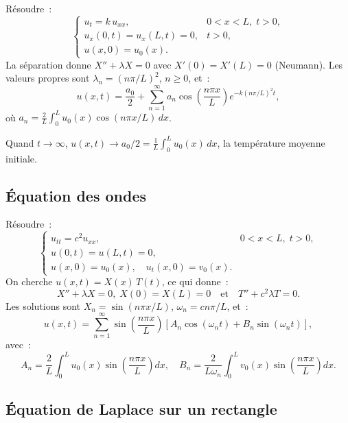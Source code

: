 \begin{exemple}
R\'esoudre~:
\[
    \begin{cases}
        u_t = k\, u_{xx}, & 0 < x < L,\; t > 0,\\
        u_x(0,t) = u_x(L,t) = 0, & t > 0,\\
        u(x,0) = u_0(x).
    \end{cases}
\]
La s\'eparation donne $X'' + \lambda X = 0$ avec $X'(0) = X'(L) = 0$
(Neumann). Les valeurs propres sont $\lambda_n = (n\pi/L)^2$,
$n \geq 0$, et~:
\[
    u(x,t) = \frac{a_0}{2} + \sum_{n=1}^{\infty} a_n
    \cos\!\left(\frac{n\pi x}{L}\right) e^{-k(n\pi/L)^2 t},
\]
o\`u $a_n = \frac{2}{L}\int_0^L u_0(x)\cos(n\pi x/L)\, dx$.

Quand $t \to \infty$, $u(x,t) \to a_0/2 = \frac{1}{L}\int_0^L u_0(x)\, dx$,
la temp\'erature moyenne initiale.
\end{exemple}

\subsection{\'Equation des ondes}

\begin{exemple}
R\'esoudre~:
\[
    \begin{cases}
        u_{tt} = c^2 u_{xx}, & 0 < x < L,\; t > 0,\\
        u(0,t) = u(L,t) = 0,\\
        u(x,0) = u_0(x), \quad u_t(x,0) = v_0(x).
    \end{cases}
\]
On cherche $u(x,t) = X(x)\, T(t)$, ce qui donne~:
\[
    X'' + \lambda X = 0, \; X(0)=X(L)=0 \quad\text{et}\quad
    T'' + c^2\lambda T = 0.
\]
Les solutions sont $X_n = \sin(n\pi x/L)$,
$\omega_n = cn\pi/L$, et~:
\[
    u(x,t) = \sum_{n=1}^{\infty} \sin\!\left(\frac{n\pi x}{L}\right)
    \left[A_n \cos(\omega_n t) + B_n \sin(\omega_n t)\right],
\]
avec~:
\[
    A_n = \frac{2}{L}\int_0^L u_0(x)\sin\!\left(\frac{n\pi x}{L}\right) dx,
    \quad
    B_n = \frac{2}{L\omega_n}\int_0^L v_0(x)\sin\!\left(\frac{n\pi x}{L}\right) dx.
\]
\end{exemple}

\subsection{\'Equation de Laplace sur un rectangle}

